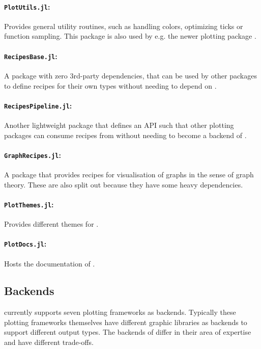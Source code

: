 \paragraph{\texttt{PlotUtils.jl}:} Provides general utility routines, such as handling colors, optimizing ticks or function sampling. This package is also used by e.g. the newer plotting package .

\paragraph{\texttt{RecipesBase.jl}:} A package with zero 3rd-party dependencies, that can be used by other packages to define recipes for their own types without needing to depend on \Plots.

\paragraph{\texttt{RecipesPipeline.jl}:} Another lightweight package that defines an API such that other plotting packages can consume recipes from \RecipesBase without needing to become a backend of \Plots.

\paragraph{\texttt{GraphRecipes.jl}:} A package that provides recipes for visualisation of graphs in the sense of graph theory.
These are also split out because they have some heavy dependencies.

\paragraph{\texttt{PlotThemes.jl}:} Provides different themes for \Plots.

\paragraph{\texttt{PlotDocs.jl}:} Hosts the documentation of \Plots.



\subsection*{Backends}

\Plots currently supports seven plotting frameworks as backends.
Typically these plotting frameworks themselves have different graphic libraries as backends to support different output types.
The backends of \Plots differ in their area of expertise and have different trade-offs.

